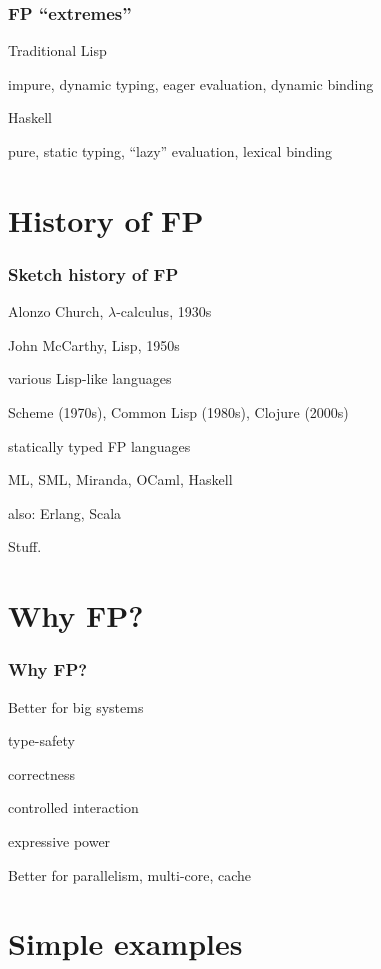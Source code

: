 \begin{frame}
\frametitle{FP ``extremes''}
\bi
\item Traditional Lisp
\bi
\item impure, dynamic typing, eager evaluation, dynamic binding
\ei
\item Haskell
\bi
\item pure, static typing, ``lazy'' evaluation, lexical binding
\ei
\ei
\end{frame}

\section{History of FP}

\begin{frame}
\frametitle{Sketch history of FP}
\bi
\item Alonzo Church, $\lambda$-calculus, 1930s
\item John McCarthy, Lisp, 1950s
\item various Lisp-like languages
\bi
\item Scheme (1970s), Common Lisp (1980s), Clojure (2000s)
\ei
\item statically typed FP languages
\bi
\item ML, SML, Miranda, OCaml, Haskell
\ei
\item also: Erlang, Scala
\ei
\begin{annotation}
Stuff.
\end{annotation}
\end{frame}

\section{Why FP?}

\begin{frame}
\frametitle{Why FP?}
\bi
\item Better for big systems
\bi
\item type-safety
\item correctness
\item controlled interaction
\item expressive power
\ei
\item Better for parallelism, multi-core, cache
\ei
\end{frame}

\section{Simple examples}

